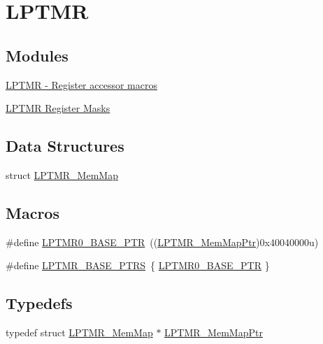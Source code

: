 \hypertarget{group___l_p_t_m_r___peripheral}{}\section{L\+P\+T\+M\+R}
\label{group___l_p_t_m_r___peripheral}
\subsection*{Modules}
\begin{DoxyCompactItemize}
\item 
\hyperlink{group___l_p_t_m_r___register___accessor___macros}{L\+P\+T\+M\+R -\/ Register accessor macros}
\item 
\hyperlink{group___l_p_t_m_r___register___masks}{L\+P\+T\+M\+R Register Masks}
\end{DoxyCompactItemize}
\subsection*{Data Structures}
\begin{DoxyCompactItemize}
\item 
struct \hyperlink{struct_l_p_t_m_r___mem_map}{L\+P\+T\+M\+R\+\_\+\+Mem\+Map}
\end{DoxyCompactItemize}
\subsection*{Macros}
\begin{DoxyCompactItemize}
\item 
\#define \hyperlink{group___l_p_t_m_r___peripheral_ga90a9194151ad11b422bcab162e797eda}{L\+P\+T\+M\+R0\+\_\+\+B\+A\+S\+E\+\_\+\+P\+T\+R}~((\hyperlink{group___l_p_t_m_r___peripheral_ga765226e2eeb35160c12820d4a2541320}{L\+P\+T\+M\+R\+\_\+\+Mem\+Map\+Ptr})0x40040000u)
\item 
\#define \hyperlink{group___l_p_t_m_r___peripheral_gac92660dedc63be48d689d43efc9f2c82}{L\+P\+T\+M\+R\+\_\+\+B\+A\+S\+E\+\_\+\+P\+T\+R\+S}~\{ \hyperlink{group___l_p_t_m_r___peripheral_ga90a9194151ad11b422bcab162e797eda}{L\+P\+T\+M\+R0\+\_\+\+B\+A\+S\+E\+\_\+\+P\+T\+R} \}
\end{DoxyCompactItemize}
\subsection*{Typedefs}
\begin{DoxyCompactItemize}
\item 
typedef struct \hyperlink{struct_l_p_t_m_r___mem_map}{L\+P\+T\+M\+R\+\_\+\+Mem\+Map} $\ast$ \hyperlink{group___l_p_t_m_r___peripheral_ga765226e2eeb35160c12820d4a2541320}{L\+P\+T\+M\+R\+\_\+\+Mem\+Map\+Ptr}
\end{DoxyCompactItemize}


